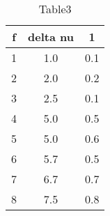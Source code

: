 \begin{table} 
 \caption{Table3}
\begin{tabular}{|*{3}{c|}}
\hline 
f & delta nu & 1\\ \hline 
1 & 1.0 & 0.1 \\ \hline 
 2 & 2.0 & 0.2 \\ \hline 
 3 & 2.5 & 0.1 \\ \hline 
 4 & 5.0 & 0.5 \\ \hline 
 5 & 5.0 & 0.6 \\ \hline 
 6 & 5.7 & 0.5 \\ \hline 
 7 & 6.7 & 0.7 \\ \hline 
 8 & 7.5 & 0.8 \\ \hline 
 \end{tabular} 
\end{table} 
